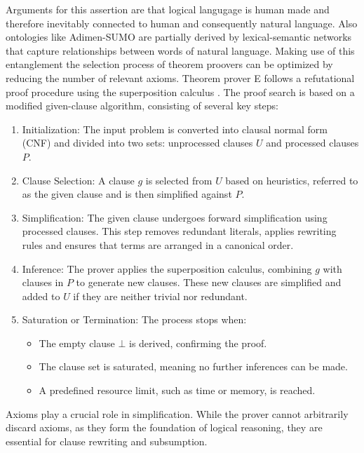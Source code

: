 \documentclass[english,version-2020-11]{uzl-thesis}
\begin{document}
Arguments for this assertion are that logical langugage is human made and therefore inevitably connected to human and consequently natural language.
Also ontologies like Adimen-SUMO are partially derived by lexical-semantic networks that capture relationships between words of natural language.
Making use of this entanglement the selection process of theorem proovers can be optimized by reducing the number of relevant axioms.
Theorem prover E follows a refutational proof procedure using the superposition calculus \cite{Schulz2019}. The proof search is based on a modified given-clause algorithm, consisting of several key steps:

\begin{enumerate}
    \item Initialization: The input problem is converted into clausal normal form (CNF) and divided into two sets: unprocessed clauses \( U \) and processed clauses \( P \).
    \item Clause Selection: A clause \( g \) is selected from \( U \) based on heuristics, referred to as the given clause and is then simplified against \( P \).
    \item Simplification: The given clause undergoes forward simplification using processed clauses. This step removes redundant literals, applies rewriting rules and ensures that terms are arranged in a canonical order.
    \item Inference: The prover applies the superposition calculus, combining \( g \) with clauses in \( P \) to generate new clauses. These new clauses are simplified and added to \( U \) if they are neither trivial nor redundant.
    \item Saturation or Termination: The process stops when:
    \begin{itemize}
        \item The empty clause \( \bot \) is derived, confirming the proof.
        \item The clause set is saturated, meaning no further inferences can be made.
        \item A predefined resource limit, such as time or memory, is reached.
    \end{itemize}
\end{enumerate}

Axioms play a crucial role in simplification. While the prover cannot arbitrarily discard axioms, as they form the foundation of logical reasoning, they are essential for clause rewriting and subsumption.
\end{document}
